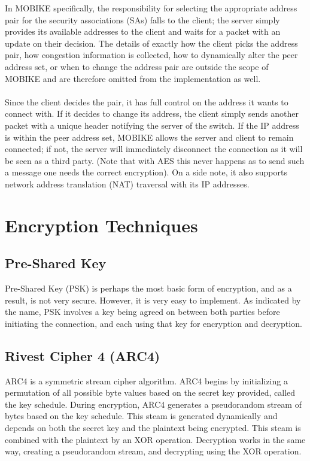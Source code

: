 \documentclass[runningheads]{llncs}
\begin{document}
In MOBIKE specifically, the responsibility for selecting the appropriate address pair for the security associations (SAs) falls to the client; the server simply provides its available addresses to the client and waits for a packet with an update on their decision. \cite{ikev2_mobike} The details of exactly how the client picks the address pair, how congestion information is collected, how to dynamically alter the peer address set, or when to change the address pair are outside the scope of MOBIKE and are therefore omitted from the implementation as well.\\
\\
Since the client decides the pair, it has full control on the address it wants to connect with. If it decides to change its address, the client simply sends another packet with a unique header notifying the server of the switch. If the IP address is within the peer address set, MOBIKE allows the server and client to remain connected; if not, the server will immediately disconnect the connection as it will be seen as a third party. (Note that with AES this never happens as to send such a message one needs the correct encryption). On a side note, it also supports network address translation (NAT) traversal with its IP addresses.
\section{Encryption Techniques}
\subsection{Pre-Shared Key}
Pre-Shared Key (PSK) is perhaps the most basic form of encryption, and as a result, is not very secure. \cite{ibm_psk} However, it is very easy to implement. As indicated by the name, PSK involves a key being agreed on between both parties before initiating the connection, and each using that key for encryption and decryption.
\subsection{Rivest Cipher 4 (ARC4)}
ARC4 is a symmetric stream cipher algorithm. \cite{arc4} ARC4 begins by initializing a permutation of all possible byte values based on the secret key provided, called the key schedule. During encryption, ARC4 generates a pseudorandom stream of bytes based on the key schedule. This steam is generated dynamically and depends on both the secret key and the plaintext being encrypted. This steam is combined with the plaintext by an XOR operation. Decryption works in the same way, creating a pseudorandom stream, and decrypting using the XOR operation.
\end{document}
